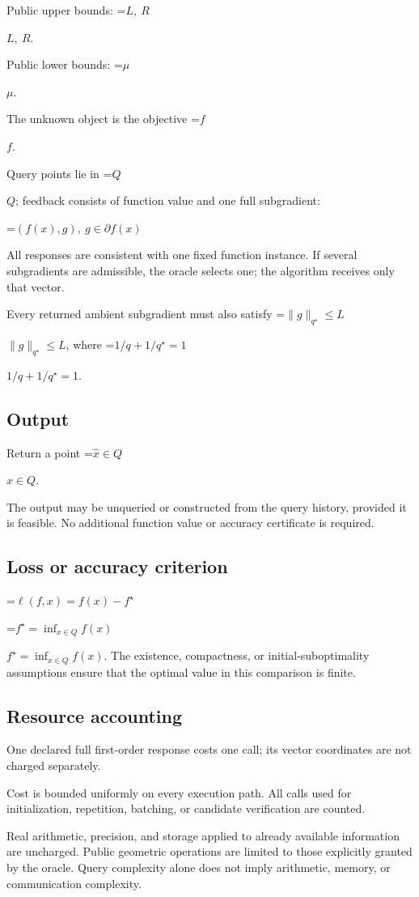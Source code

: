 \documentclass[10pt,a4paper]{article}
\newcommand{\AtlasMath}[1]{\par\begingroup\centering\setbox0=\hbox{$\displaystyle #1$}\ifdim\wd0>1.4\linewidth\typeout{ATLAS WIDE FORMULA: \the\wd0}\fi\ifdim\wd0>\linewidth\resizebox{\linewidth}{!}{\box0}\else\box0\fi\par\endgroup}
\newcommand{\AtlasInlineMath}[1]{\begingroup\setbox0=\hbox{$#1$}\ifdim\wd0>.4\linewidth\endgroup\AtlasMath{#1}\else\endgroup$#1$\fi}
\begin{document}
Public upper bounds: \AtlasInlineMath{L,\ R}.

Public lower bounds: \AtlasInlineMath{\mu}.

The unknown object is the objective \AtlasInlineMath{f}.

Query points lie in \AtlasInlineMath{Q}; feedback consists of function value and one full subgradient:


\AtlasMath{(f(x),g),\ g\in\partial f(x)}


All responses are consistent with one fixed function instance. If several subgradients are admissible, the oracle selects one; the algorithm receives only that vector.

Every returned ambient subgradient must also satisfy \AtlasInlineMath{\|g\|_{q^\star}\le L}, where \AtlasInlineMath{1/q+1/q^\star=1}.

\subsection{Output}
Return a point \AtlasInlineMath{\widehat x\in Q}.

The output may be unqueried or constructed from the query history, provided it is feasible. No additional function value or accuracy certificate is required.

\subsection{Loss or accuracy criterion}

\AtlasMath{\ell(f,x)=f(x)-f^\star}


\AtlasInlineMath{f^\star=\inf_{x\in Q}f(x)}. The existence, compactness, or initial-suboptimality assumptions ensure that the optimal value in this comparison is finite.

\subsection{Resource accounting}
One declared full first-order response costs one call; its vector coordinates are not charged separately.

Cost is bounded uniformly on every execution path. All calls used for initialization, repetition, batching, or candidate verification are counted.

Real arithmetic, precision, and storage applied to already available information are uncharged. Public geometric operations are limited to those explicitly granted by the oracle. Query complexity alone does not imply arithmetic, memory, or communication complexity.
\end{document}
